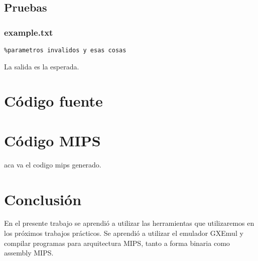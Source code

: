 \subsection{Pruebas}
\subsubsection{example.txt}
\begin{verbatim}
%parametros invalidos y esas cosas
\end{verbatim}
La salida es la esperada.

\section{Código fuente}



\bigskip

%

\bigskip

%

\section{Código MIPS}

aca va el codigo mips generado.
%

\bigskip

%

\section{Conclusión}
     En el presente trabajo se aprendió a utilizar las herramientas que utilizaremos en los próximos trabajos prácticos. 
     Se aprendió a utilizar el emulador GXEmul y compilar programas para arquitectura MIPS, tanto a forma binaria como assembly MIPS.



%


